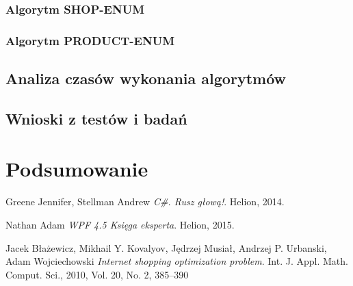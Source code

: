 \documentclass[a4paper]{article}
\let\oldsection\section
\renewcommand\section{\clearpage\oldsection}
\begin{document}
\subsubsection{Algorytm SHOP-ENUM}
\subsubsection{Algorytm PRODUCT-ENUM}
\subsection{Analiza czasów wykonania algorytmów}
\subsection{Wnioski z testów i badań}

\section{Podsumowanie}
 
\begin{thebibliography}{9}

  Greene Jennifer, Stellman Andrew 
  \emph{C\#. Rusz głową!}.
  Helion,
  2014.
  
	Nathan Adam
	\emph{WPF 4.5 Księga eksperta}. Helion, 2015.  
  
	Jacek Błażewicz, Mikhail Y. Kovalyov, Jędrzej Musiał, Andrzej P. Urbanski, Adam Wojciechowski
	\emph{Internet shopping optimization problem}.
	Int. J. Appl. Math. Comput. Sci., 2010, Vol. 20, No. 2, 385–390 
	
  \end{thebibliography}
\end{document}
